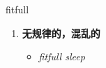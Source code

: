 
\begin{frame}
{\huge fitfull}
\begin{center}
\begin{enumerate}\Large
  \item \textbf{无规律的，混乱的}
  \begin{itemize}
    \item \em{\Large{fitfull sleep}}
  \end{itemize}
\end{enumerate}
\end{center}
\end{frame}
